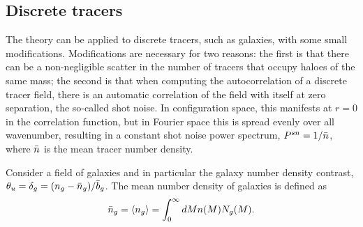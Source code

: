 \subsection{Discrete tracers}
The theory can be applied to discrete tracers, such as galaxies, with some small modifications. Modifications are necessary for two reasons: the first is that there can be a non-negligible scatter in the number of tracers that occupy haloes of the same mass; the second is that when computing the autocorrelation of a discrete tracer field, there is an automatic correlation of the field with itself at zero separation, the so-called shot noise. In configuration space, this manifests at $r=0$ in the correlation function, but in Fourier space this is spread evenly over all wavenumber, resulting in a constant shot noise power spectrum, $P^{sn} = 1/\Bar{n}$, where $\Bar{n}$ is the mean tracer number density.

Consider a field of galaxies and in particular the galaxy number density contrast, $\theta_u = \delta_g = (n_g - \Bar{n}_g)/\Bar{b}_g$. The mean number density of galaxies is defined as
\begin{equation}
    \Bar{n}_g = \langle n_g \rangle = \int_0^\infty dM n(M) N_g(M).
\end{equation}
